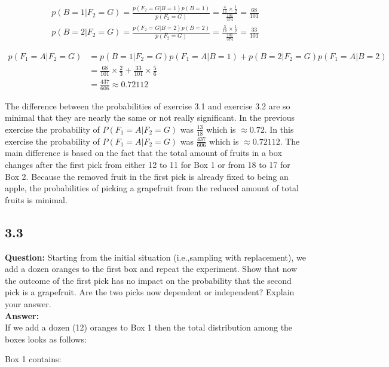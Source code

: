 \documentclass[a4paper]{article}
\begin{document}
\begin{align*}
	p(B = 1 | F_2 = G) = \frac{p(F_2 = G | B = 1)p(B = 1)}{p(F_2 = G)} = \frac{\frac{4}{11} \times \frac{1}{2}}{\frac{101}{374}} = \frac{68}{101}\\
	p(B = 2 | F_2 = G) = \frac{p(F_2 = G | B = 2)p(B = 2)}{p(F_2 = G)} = \frac{\frac{3}{17} \times \frac{1}{2}}{\frac{101}{374}} = \frac{33}{101}
\end{align*}

\begin{align*}
	p(F_1 = A | F_2 = G) &=   p(B = 1| F_2 = G)p(F_1 = A | B = 1) + p(B = 2 | F_2 = G)p(F_1 = A | B = 2)\\
	&= \frac{68}{101} \times \frac{2}{3} + \frac{33}{101} \times \frac{5}{6}\\
	&= \frac{437}{606} \approx 0.72112
\end{align*}

The difference between the probabilities of exercise 3.1 and exercise 3.2 are so minimal that they are nearly the same or not really significant. In the previous exercise the probability of $P(F_1 = A | F_2 = G)$ was $\frac{13}{18}$ which is $\approx 0.72$. In this exercise the probability of $P(F_1 = A | F_2 = G)$ was $\frac{437}{606}$ which is $\approx 0.72112$. The main difference is based on the fact that the total amount of fruits in a box changes after the first pick from either 12 to 11 for Box 1 or from 18 to 17 for Box 2. Because the removed fruit in the first pick is already fixed to being an apple, the probabilities of picking a grapefruit from the reduced amount of total fruits is minimal.


\subsection*{3.3}

\textbf{Question:} Starting from the initial situation (i.e.,sampling with replacement), we add a dozen oranges to the first box and repeat the experiment. Show that now the outcome of the first pick has no impact on the probability that the second pick is a grapefruit. Are the two picks now dependent or independent? Explain your answer.\\

\textbf{Answer:}\\

If we add a dozen (12) oranges to Box 1 then the total distribution among the boxes looks as follows:

Box 1 contains:
\end{document}
